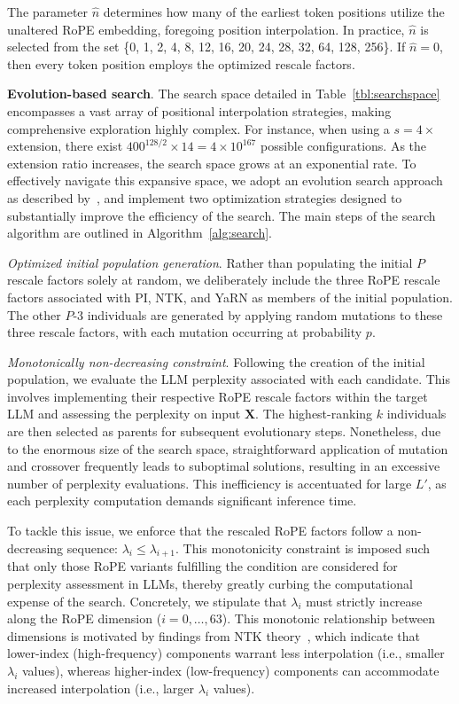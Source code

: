 The parameter $\hat{n}$ determines how many of the earliest token positions utilize the unaltered RoPE embedding, foregoing position interpolation. In practice, $\hat{n}$ is selected from the set \{0, 1, 2, 4, 8, 12, 16, 20, 24, 28, 32, 64, 128, 256\}. If $\hat{n}=0$, then every token position employs the optimized rescale factors.

\textbf{Evolution-based search}. The search space detailed in Table~\ref{tbl:searchspace} encompasses a vast array of positional interpolation strategies, making comprehensive exploration highly complex. For instance, when using a $s=4\times$ extension, there exist $400^{128/2}\times14 = 4\times10^{167}$ possible configurations. As the extension ratio increases, the search space grows at an exponential rate. To effectively navigate this expansive space, we adopt an evolution search approach as described by~\cite{guo2020single}, and implement two optimization strategies designed to substantially improve the efficiency of the search. The main steps of the search algorithm are outlined in Algorithm~\ref{alg:search}.

\textit{Optimized initial population generation}. Rather than populating the initial $P$ rescale factors solely at random, we deliberately include the three RoPE rescale factors associated with PI, NTK, and YaRN as members of the initial population. The other $P$-3 individuals are generated by applying random mutations to these three rescale factors, with each mutation occurring at probability $p$.

\textit{Monotonically non-decreasing constraint}. Following the creation of the initial population, we evaluate the LLM perplexity associated with each candidate. This involves implementing their respective RoPE rescale factors within the target LLM and assessing the perplexity on input $\mathbf{X}$. The highest-ranking $k$ individuals are then selected as parents for subsequent evolutionary steps. Nonetheless, due to the enormous size of the search space, straightforward application of mutation and crossover frequently leads to suboptimal solutions, resulting in an excessive number of perplexity evaluations. This inefficiency is accentuated for large $L'$, as each perplexity computation demands significant inference time.

To tackle this issue, we enforce that the rescaled RoPE factors follow a non-decreasing sequence: $\lambda_i \le \lambda_{i+1}$. This monotonicity constraint is imposed such that only those RoPE variants fulfilling the condition are considered for perplexity assessment in LLMs, thereby greatly curbing the computational expense of the search. Concretely, we stipulate that $\lambda_i$ must strictly increase along the RoPE dimension ($i = 0, \ldots, 63$). This monotonic relationship between dimensions is motivated by findings from NTK theory~\cite{jacot2018neural,tancik2020fourier,ntk}, which indicate that lower-index (high-frequency) components warrant less interpolation (i.e., smaller $\lambda_i$ values), whereas higher-index (low-frequency) components can accommodate increased interpolation (i.e., larger $\lambda_i$ values).

